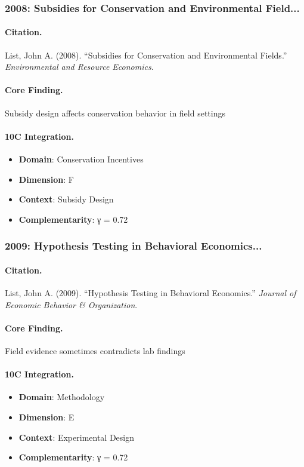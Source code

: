 \subsubsection{2008: Subsidies for Conservation and Environmental Field...}

\paragraph{Citation.}
List, John A. (2008). ``Subsidies for Conservation and Environmental Fields.''
\textit{Environmental and Resource Economics}.

\paragraph{Core Finding.}
Subsidy design affects conservation behavior in field settings

\paragraph{10C Integration.}
\begin{itemize}[nosep]
  \item \textbf{Domain}: Conservation Incentives
  \item \textbf{Dimension}: F
  \item \textbf{Context}: Subsidy Design
  \item \textbf{Complementarity}: γ = 0.72
\end{itemize}


\subsubsection{2009: Hypothesis Testing in Behavioral Economics...}

\paragraph{Citation.}
List, John A. (2009). ``Hypothesis Testing in Behavioral Economics.''
\textit{Journal of Economic Behavior & Organization}.

\paragraph{Core Finding.}
Field evidence sometimes contradicts lab findings

\paragraph{10C Integration.}
\begin{itemize}[nosep]
  \item \textbf{Domain}: Methodology
  \item \textbf{Dimension}: E
  \item \textbf{Context}: Experimental Design
  \item \textbf{Complementarity}: γ = 0.72
\end{itemize}


